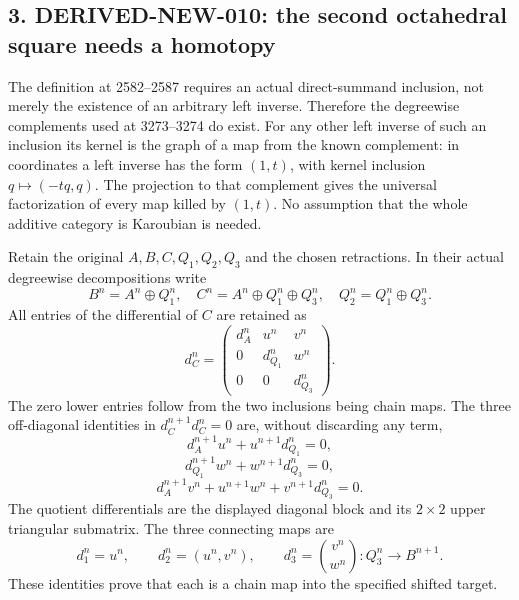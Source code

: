 \subsection{\texorpdfstring{3. DERIVED-NEW-010:\allowbreak{} the second octahedral square needs a homotopy}{3.  the second octahedral square needs a homotopy}}\label{proofs-2995-3485-derived-new-010-the-second-octahedral-square-needs-a-homotopy}

The definition at 2582–\allowbreak{}2587 requires an actual direct-summand inclusion,\allowbreak{} not merely the existence of an arbitrary left inverse. Therefore the degreewise complements used at 3273–\allowbreak{}3274 do exist. For any other left inverse of such an inclusion its kernel is the graph of a map from the known complement:\allowbreak{} in coordinates a left inverse has the form \((1,t)\),\allowbreak{} with kernel inclusion \(q\mapsto(-tq,q)\). The projection to that complement gives the universal factorization of every map killed by \((1,t)\). No assumption that the whole additive category is Karoubian is needed.

Retain the original \(A,B,C,Q_1,Q_2,Q_3\) and the chosen retractions. In their actual degreewise decompositions write \[
B^n=A^n\oplus Q_1^n,\quad
C^n=A^n\oplus Q_1^n\oplus Q_3^n,\quad
Q_2^n=Q_1^n\oplus Q_3^n.
\] All entries of the differential of \(C\) are retained as \[
d_C^n=\begin{pmatrix}
d_A^n&u^n&v^n\\0&d_{Q_1}^n&w^n\\0&0&d_{Q_3}^n
\end{pmatrix}.
\] The zero lower entries follow from the two inclusions being chain maps. The three off-diagonal identities in \(d_C^{n+1}d_C^n=0\) are,\allowbreak{} without discarding any term,\allowbreak{} \[
d_A^{n+1}u^n+u^{n+1}d_{Q_1}^n=0,
\] \[
d_{Q_1}^{n+1}w^n+w^{n+1}d_{Q_3}^n=0,
\] \[
d_A^{n+1}v^n+u^{n+1}w^n+v^{n+1}d_{Q_3}^n=0.
\] The quotient differentials are the displayed diagonal block and its \(2\times2\) upper triangular submatrix. The three connecting maps are \[
d_1^n=u^n,\qquad d_2^n=(u^n,v^n),\qquad
d_3^n=\binom{v^n}{w^n}:Q_3^n\to B^{n+1}.
\] These identities prove that each is a chain map into the specified shifted target.

